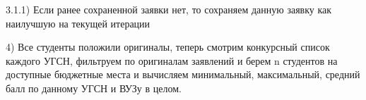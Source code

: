 3.1.1) Если ранее сохраненной заявки нет, то сохраняем данную заявку как наилучшую на текущей итерации 

4) Все студенты положили оригиналы, теперь смотрим конкурсный список каждого УГСН, фильтруем по оригиналам заявлений и берем n студентов на доступные бюджетные места и вычисляем минимальный, максимальный, средний балл по данному УГСН и ВУЗу в целом.


























\pagebreak